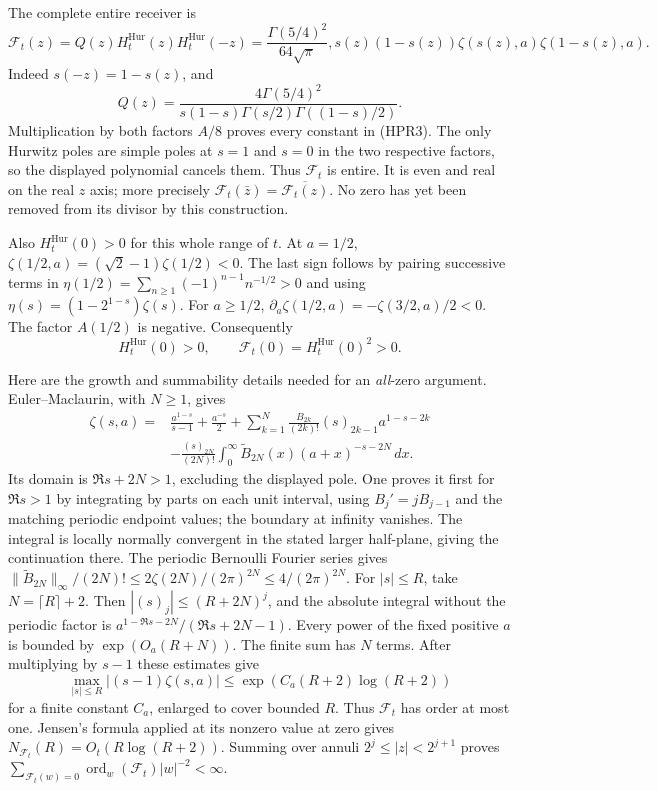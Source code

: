 The complete entire receiver is
\begin{equation}\tag{HPR3}
 \mathscr F_t(z)=Q(z)H_t^{\mathrm{Hur}}(z)H_t^{\mathrm{Hur}}(-z)
 =\frac{\Gamma(5/4)^2}{64\sqrt\pi},
       s(z)(1-s(z))\zeta(s(z),a)\zeta(1-s(z),a).
\end{equation}
Indeed $s(-z)=1-s(z)$, and
\[
 Q(z)=\frac{4\Gamma(5/4)^2}
 {s(1-s)\Gamma(s/2)\Gamma((1-s)/2)}.
\]
Multiplication by both factors $A/8$ proves every constant in (HPR3).
The only Hurwitz poles are simple poles at $s=1$ and $s=0$ in the
two respective factors, so the displayed polynomial cancels them.
Thus $\mathscr F_t$ is entire. It is even and real on the real $z$ axis;
more precisely $\mathscr F_t(\bar z)=\overline{\mathscr F_t(z)}$.
No zero has yet been removed from its divisor by this construction.

Also $H_t^{\mathrm{Hur}}(0)>0$ for this whole range of $t$. At $a=1/2$,
$\zeta(1/2,a)=(\sqrt2-1)\zeta(1/2)<0$.
The last sign follows by pairing successive terms in
$\eta(1/2)=\sum_{n\ge1}(-1)^{n-1}n^{-1/2}>0$ and using
$\eta(s)=(1-2^{1-s})\zeta(s)$.
For $a\ge1/2$,
$\partial_a\zeta(1/2,a)=-\zeta(3/2,a)/2<0$.
The factor $A(1/2)$ is negative. Consequently
\begin{equation}\tag{HPR4}
 H_t^{\mathrm{Hur}}(0)>0,\qquad \mathscr F_t(0)=H_t^{\mathrm{Hur}}(0)^2>0.
\end{equation}

Here are the growth and summability details needed for an \emph{all}-zero
argument. Euler--Maclaurin, with $N\ge1$, gives
\begin{align*}
 \zeta(s,a)={}&\frac{a^{1-s}}{s-1}+\frac{a^{-s}}2
 +\sum_{k=1}^{N}\frac{B_{2k}}{(2k)!}(s)_{2k-1}a^{1-s-2k}\\
 &-\frac{(s)_{2N}}{(2N)!}
       \int_0^{\infty}\widetilde B_{2N}(x)(a+x)^{-s-2N}\,dx.
\end{align*}
Its domain is $\Re s+2N>1$, excluding the displayed pole.
One proves it first for $\Re s>1$ by integrating by parts on each
unit interval, using $B_j'=jB_{j-1}$ and the matching periodic endpoint
values; the boundary at infinity vanishes. The integral is locally
normally convergent in the stated larger half-plane, giving the
continuation there. The periodic Bernoulli Fourier series gives
$\|\widetilde B_{2N}\|_\infty/(2N)!
\le 2\zeta(2N)/(2\pi)^{2N}\le4/(2\pi)^{2N}$.
For $|s|\le R$, take $N=\lceil R\rceil+2$.
Then $|(s)_j|\le(R+2N)^j$, and the absolute integral without
the periodic factor is
$a^{1-\Re s-2N}/(\Re s+2N-1)$.
Every power of the fixed positive $a$ is bounded by
$\exp(O_a(R+N))$. The finite sum has $N$ terms.
After multiplying by $s-1$ these estimates give
\begin{equation}\tag{HPR5}
 \max_{|s|\le R}|(s-1)\zeta(s,a)|
       \le \exp(C_a(R+2)\log(R+2))
\end{equation}
for a finite constant $C_a$, enlarged to cover bounded $R$.
Thus $\mathscr F_t$ has order at most one. Jensen's formula applied at its
nonzero value at zero gives $N_{\mathscr F_t}(R)=O_t(R\log(R+2))$.
Summing over annuli $2^j\le|z|<2^{j+1}$ proves
$\sum_{\mathscr F_t(w)=0}\operatorname{ord}_w(\mathscr F_t)|w|^{-2}<\infty$.

